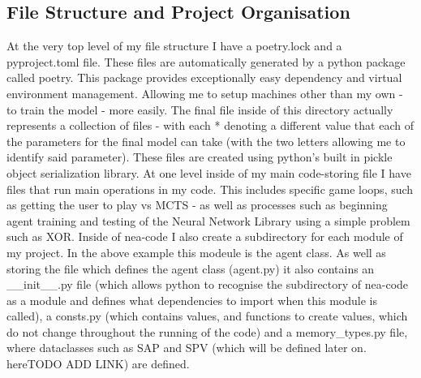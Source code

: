 \documentclass{article}
\begin{document}
    \subsection{File Structure and Project Organisation} \label{File-Structure}
    At the very top level of my file structure I have a poetry.lock and a pyproject.toml file. These files are automatically generated by
    a python package called poetry. This package provides exceptionally easy dependency and virtual environment management. Allowing me to
    setup machines other than my own - to train the model - more easily. 
    The final file inside of this directory actually represents a collection of files - with each * denoting a different value that each of the 
    parameters for the final model can take (with the two letters allowing me to identify said parameter). These files are created using python's built in pickle object serialization library.
    At one level inside of my main code-storing file I have files that run main operations in my code. This includes specific game loops, such as getting the user to play 
    vs MCTS - as well as processes such as beginning agent training and testing of the Neural Network Library using a simple problem such as XOR.
    Inside of nea-code I also create a subdirectory for each module of my project. In the above example this modeule is the agent class. As well as storing the file which defines the agent class (agent.py)
    it also contains an \_\_init\_\_.py file (which allows python to recognise the subdirectory of nea-code as a module and defines what dependencies to import when this module is called), a consts.py (which contains
    values, and functions to create values, which do not change throughout the running of the code) and a memory_types.py file, where dataclasses such as SAP and SPV (which will be defined later on. hereTODO ADD LINK) are defined.
\end{document}
